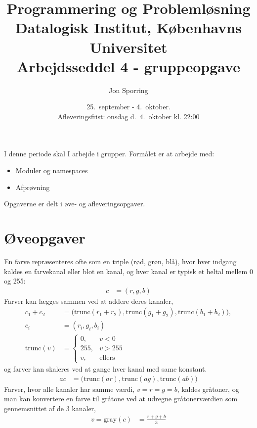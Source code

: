 \documentclass[a4paper,12pt]{article}
\title{Programmering og Problemløsning\\Datalogisk Institut,
  Københavns Universitet\\Arbejdsseddel 4 - gruppeopgave}
\author{Jon Sporring}
\date{25.\ september - 4.\ oktober.\\Afleveringsfrist: onsdag d.\ 4.\ oktober kl. 22:00}
\begin{document}
\maketitle

I denne periode skal I arbejde i grupper. Formålet er at arbejde med:
\begin{itemize}
\item Moduler og namespaces
\item Afprøvning
\end{itemize}
 
Opgaverne er delt i øve- og afleveringsopgaver. 

\section*{Øveopgaver}
En farve repræsenteres ofte som en triple (rød, grøn, blå), hvor hver indgang kaldes en farvekanal eller blot en kanal, og hver kanal er typisk et heltal mellem 0 og 255:
\begin{align}
  c &= (r, g,b)
\end{align}
Farver kan lægges sammen ved at addere deres kanaler,
\begin{align}
  c_1 + c_2 &= \big(\text{trunc}(r_1+r_2), \text{trunc}(g_1+g_2), \text{trunc}(b_1+b_2)\big),
  \\c_i &= (r_i, g_i,b_i)
  \\\text{trunc}(v) &=
  \begin{cases}
    0, &v < 0
    \\255, &v > 255
    \\v, &\text{ellers}
  \end{cases}
\end{align}
og farver kan skaleres ved at gange hver kanal med same konstant.
\begin{align}
  a c &= \big(\text{trunc}(a r), \text{trunc}(a g), \text{trunc}(a b)\big)
\end{align}
Farver, hvor alle kanaler har samme værdi, $v=r=g=b$, kaldes gråtoner, og man kan konvertere en farve til gråtone ved at udregne gråtonerværdien som gennemsnittet af de 3 kanaler,
\begin{align}
  v = \text{gray}(c) &= \frac{r+g+b}{3}
\end{align}
\end{document}
